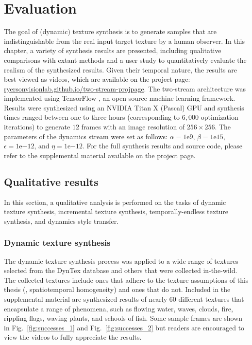\chapter{Evaluation}\label{chap:evaluation}

The goal of (dynamic) texture synthesis is to generate 
samples that are indistinguishable from the real input target
texture by a human observer.
In this chapter, a variety of synthesis results are presented,
including qualitative comparisons with extant methods and a user study to quantitatively evaluate the realism
of the synthesized results.
Given their temporal nature, the results are best viewed as 
videos, which are available on the project page: \url{ryersonvisionlab.github.io/two-stream-projpage}.
The two-stream architecture was implemented using TensorFlow
\cite{tabadi2015tensorflow}, an open source machine learning framework.
Results were synthesized using an NVIDIA Titan X (Pascal) GPU
and synthesis times ranged between one to three hours (corresponding to $6,000$ optimization iterations)
to generate $12$ frames with an image resolution of 
$256 \times 256$. The parameters of the dynamics stream were set as follows: $\alpha = 1\mathrm{e}{9}$, $\beta = 1\mathrm{e}{15}$, $\epsilon = 1\mathrm{e}{-12}$, and $\eta = 1\mathrm{e}{-12}$.
For the full synthesis results and source code, please refer to the
supplemental material available on the project page.

\section{Qualitative results}\label{sec:qualitative_results}

In this section, a qualitative analysis is performed on the tasks of dynamic texture synthesis, incremental texture synthesis,
temporally-endless texture synthesis, and dynamics style transfer.

\subsection{Dynamic texture synthesis}

The dynamic texture synthesis process was applied 
to a wide range of textures selected from the 
DynTex \cite{peteri2010} database and others that were collected in-the-wild.
The collected textures include ones that adhere to the texture assumptions of this thesis (\ie, spatiotemporal homogeneity) and ones that do not.
Included in the supplemental material are synthesized results
of nearly 60 different textures that encapsulate a range of
phenomena, such as flowing water, waves, clouds, fire, rippling
flags, waving plants, and schools of fish.
Some sample frames are shown in Fig.\ \ref{fig:successes_1} and Fig.\ \ref{fig:successes_2}
but readers are encouraged to view the videos to fully appreciate
the results.

